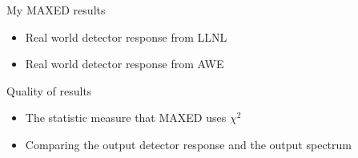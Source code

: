 \documentclass[11pt]{article}
\begin{document}
My MAXED results
\begin{itemize}
\item Real world detector response from LLNL
\item Real world detector response from AWE
\end{itemize}

Quality of results
\begin{itemize}
\item The statistic measure that MAXED uses $\chi^2$
\item Comparing the output detector response and the output spectrum
\end{itemize}
   
   
\end{document}
